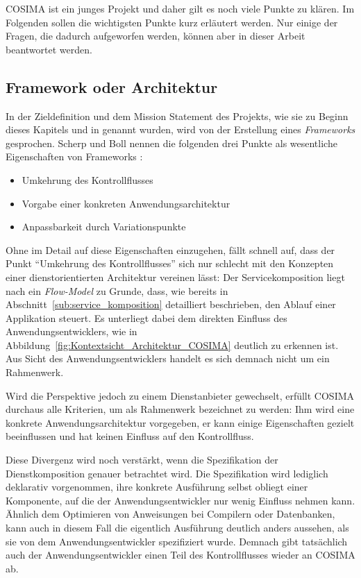   COSIMA ist ein junges Projekt und daher gilt es noch viele Punkte zu klären. Im Folgenden sollen die wichtigsten Punkte kurz erläutert werden. Nur einige der Fragen, die dadurch aufgeworfen werden, können aber in dieser Arbeit beantwortet werden.
  
\subsection{Framework oder Architektur} %
\label{sub:framework_oder_architektur}

  In der Zieldefinition und dem Mission Statement des Projekts, wie sie zu Beginn dieses Kapitels und in \citep{bericht} genannt wurden, wird von der Erstellung eines \emph{Frameworks} gesprochen. Scherp und Boll nennen die folgenden drei Punkte als wesentliche Eigenschaften von Frameworks \citep[S. 396f]{scherp2006fe}:
  
  \begin{itemize}
    \item Umkehrung des Kontrollflusses
    \item Vorgabe einer konkreten Anwendungsarchitektur
    \item Anpassbarkeit durch Variationspunkte
  \end{itemize}
  
  Ohne im Detail auf diese Eigenschaften einzugehen, fällt schnell auf, dass der Punkt "`Umkehrung des Kontrollflusses"' sich nur schlecht mit den Konzepten einer dienstorientierten Architektur vereinen lässt: Der Servicekomposition liegt nach \citep[S. 320]{web_services_principles_and_technology} ein \emph{Flow-Model} zu Grunde, dass, wie bereits in Abschnitt~\ref{sub:service_komposition} detailliert beschrieben, den Ablauf einer Applikation steuert. Es unterliegt dabei dem direkten Einfluss des Anwendungsentwicklers, wie in Abbildung~\ref{fig:Kontextsicht_Architektur_COSIMA} deutlich zu erkennen ist. Aus Sicht des Anwendungsentwicklers handelt es sich demnach nicht um ein Rahmenwerk.
  
  Wird die Perspektive jedoch zu einem Dienstanbieter gewechselt, erfüllt COSIMA durchaus alle Kriterien, um als Rahmenwerk bezeichnet zu werden: Ihm wird eine konkrete Anwendungsarchitektur vorgegeben, er kann einige Eigenschaften gezielt beeinflussen und hat keinen Einfluss auf den Kontrollfluss.
  
  Diese Divergenz wird noch verstärkt, wenn die Spezifikation der Dienstkomposition genauer betrachtet wird. Die Spezifikation wird lediglich deklarativ vorgenommen, ihre konkrete Ausführung selbst obliegt einer Komponente, auf die der Anwendungsentwickler nur wenig Einfluss nehmen kann. Ähnlich dem Optimieren von Anweisungen bei Compilern oder Datenbanken, kann auch in diesem Fall die eigentlich Ausführung deutlich anders aussehen, als sie von dem Anwendungsentwickler spezifiziert wurde. Demnach gibt tatsächlich auch der Anwendungsentwickler einen Teil des Kontrollflusses wieder an COSIMA ab.
  
